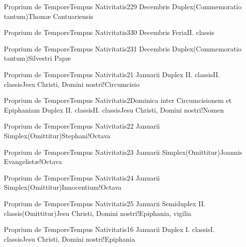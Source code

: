 \documentclass[invitatoriale-romanum.tex]{subfiles}
\begin{document}
	{Proprium de Tempore}{Tempus Nativitatis}{2}{29 Decembris}
	{Duplex}{(Commemoratio tantum)}{Thomæ Cantuariensis}
	{}
	{}

	{Proprium de Tempore}{Tempus Nativitatis}{3}{30 Decembris}
	{Feria}{II. classis}{}
	{}
	{}

	{Proprium de Tempore}{Tempus Nativitatis}{2}{31 Decembris}
	{Duplex}{(Commemoratio tantum)}{Silvestri Papæ}
	{}
	{}

	{Proprium de Tempore}{Tempus Nativitatis}{2}{1 Januarii}
	{Duplex II. classis}{II. classis}{Jesu Christi, Domini nostri!Circumcisio}
	{}
	{}

	{Proprium de Tempore}{Tempus Nativitatis}{2}{Dominica inter Circumcisionem et Epiphaniam}
	{Duplex II. classis}{II. classis}{Jesu Christi, Domini nostri!Nomen}
	{}
	{}

	{Proprium de Tempore}{Tempus Nativitatis}{2}{2 Januarii}
	{Simplex}{(Omittitur)}{Stephani!Octava}
	{}
	{}

	{Proprium de Tempore}{Tempus Nativitatis}{2}{3 Januarii}
	{Simplex}{(Omittitur)}{Joannis Evangelistæ!Octava}
	{}
	{}

	{Proprium de Tempore}{Tempus Nativitatis}{2}{4 Januarii}
	{Simplex}{(Omittitur)}{Innocentium!Octava}
	{}
	{}

	{Proprium de Tempore}{Tempus Nativitatis}{2}{5 Januarii}
	{Semiduplex II. classis}{(Omittitur)}{Jesu Christi, Domini nostri!Epiphania, vigilia}
	{}
	{}

\pagebreak

	{Proprium de Tempore}{Tempus Nativitatis}{1}{6 Januarii}
	{Duplex I. classis}{I. classis}{Jesu Christi, Domini nostri!Epiphania}
	{}
	{}
\end{document}

